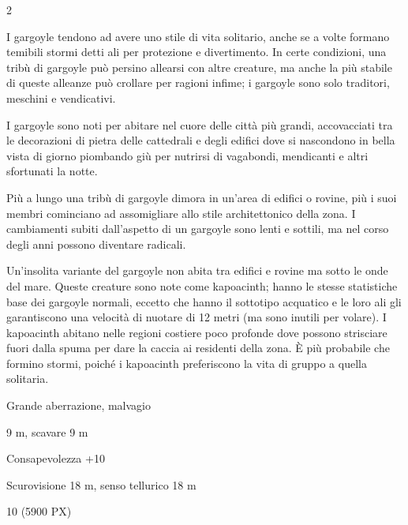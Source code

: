 \begin{multicols}{2}
{I gargoyle tendono ad avere uno stile di vita solitario, anche se a volte formano temibili stormi detti ali per protezione e divertimento. In certe condizioni, una tribù di gargoyle può persino allearsi con altre creature, ma anche la più stabile di queste alleanze può crollare per ragioni infime; i gargoyle sono solo traditori, meschini e vendicativi.

I gargoyle sono noti per abitare nel cuore delle città più grandi, accovacciati tra le decorazioni di pietra delle cattedrali e degli edifici dove si nascondono in bella vista di giorno piombando giù per nutrirsi di vagabondi, mendicanti e altri sfortunati la notte.

Più a lungo una tribù di gargoyle dimora in un'area di edifici o rovine, più i suoi membri cominciano ad assomigliare allo stile architettonico della zona. I cambiamenti subiti dall'aspetto di un gargoyle sono lenti e sottili, ma nel corso degli anni possono diventare radicali.

Un'insolita variante del gargoyle non abita tra edifici e rovine ma sotto le onde del mare. Queste creature sono note come kapoacinth; hanno le stesse statistiche base dei gargoyle normali, eccetto che hanno il sottotipo acquatico e le loro ali gli garantiscono una velocità di nuotare di 12 metri (ma sono inutili per volare). I kapoacinth abitano nelle regioni costiere poco profonde dove possono strisciare fuori dalla spuma per dare la caccia ai residenti della zona. È più probabile che formino stormi, poiché i kapoacinth preferiscono la vita di gruppo a quella solitaria.

\begin{description}[noitemsep, topsep=0pt, parsep=0pt, partopsep=0pt, itemsep=1pt, leftmargin=2.35cm,  labelwidth=2.2cm, itemindent=0cm, listparindent=0pt] %
\setlength{\baselineskip}{10pt}
\item[\textbf{Taglia/Tipo}] Grande aberrazione, malvagio
\item[\textbf{Caratt.}] 
\item[\textbf{Punti Ferita}] 
\item[\textbf{Movimento}] 9 m, scavare 9 m
\item[\textbf{Tiri Salvez.}] 
\item[\textbf{Comp.}] Consapevolezza +10
\item[\textbf{Sensi}] Scurovisione 18 m, senso tellurico 18 m
\item[\textbf{Sfida}] 10 (5900 PX)
\end{description}
\smallskip

}
\end{multicols}
